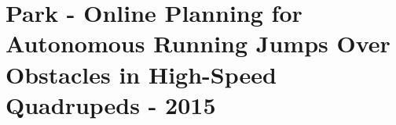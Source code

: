 \section{Park - Online Planning for Autonomous Running Jumps Over Obstacles in High-Speed Quadrupeds \cite{Wensing2015} - 2015}


